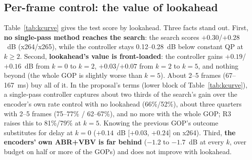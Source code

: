 \documentclass[conference]{IEEEtran}
\begin{document}
\subsection{Per-frame control: the value of lookahead}
Table~\ref{tab:kcurve} gives the test score by lookahead. Three facts stand out. First, \textbf{no single-pass method reaches the search}: the search scores $+0.30$/$+0.28$~dB (x264/x265), while the controller stays 0.12--0.28~dB below constant QP at $k\ge 2$. Second, \textbf{lookahead's value is front-loaded}: the controller gains $+0.19$/$+0.16$~dB from $k{=}0$ to $k{=}2$, $+0.03$/$+0.07$ from $k{=}2$ to $k{=}5$, and nothing beyond (the whole GOP is slightly worse than $k{=}5$). About 2--5 frames (67--167~ms) buy all of it. In the proposal's terms (lower block of Table~\ref{tab:kcurve}), a single-pass controller captures about two thirds of the search's gain over the encoder's own rate control with no lookahead (66\%/52\%), about three quarters with 2--5 frames (75--77\% / 62--67\%), and no more with the whole GOP; R3 raises this to 81\%/79\% at $k{=}5$. Knowing the previous GOP's outcome substitutes for delay at $k{=}0$ ($+0.14$~dB [$+0.03$, $+0.24$] on x264). Third, \textbf{the encoders' own ABR+VBV is far behind} ($-1.2$ to $-1.7$~dB at every $k$, over budget on half or more of the GOPs) and does not improve with lookahead.
\end{document}
